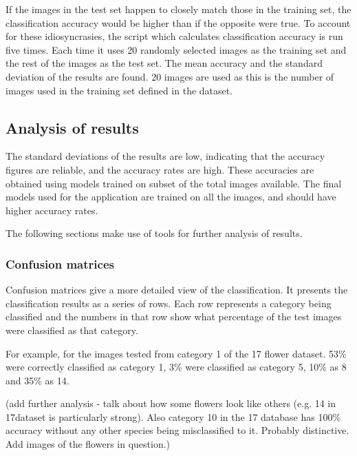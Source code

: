 \documentclass[11pt, a4paper]{report}
\begin{document}
If the images in the test set happen to closely match those in the training set, the classification accuracy would be higher than if the opposite were true. To account for these idiosyncrasies, the script which calculates classification accuracy is run five times. Each time it uses 20 randomly selected images as the training set and the rest of the images as the test set. The mean accuracy and the standard deviation of the results are found. 20 images are used as this is the number of images used in the training set defined in the dataset. 

\subsection{Analysis of results}
%
%
%

The standard deviations of the results are low, indicating that the accuracy figures are reliable, and the accuracy rates are high. These accuracies are obtained using models trained on subset of the total images available. The final models used for the application are trained on all the images, and should have higher accuracy rates.

The following sections make use of tools for further analysis of results. 

\subsubsection{Confusion matrices}

Confusion matrices give a more detailed view of the classification. It presents the classification results as a series of rows. Each row represents a category being classified and the numbers in that row show what percentage of the test images were classified as that category. 

For example, for the images tested from category 1 of the 17 flower dataset. 53\% were correctly classified as category 1, 3\% were classified as category 5, 10\% as 8 and 35\% as 14.

(add further analysis - talk about how some flowers look like others (e.g. 14 in 17dataset is particularly strong). Also category 10 in the 17 database has 100\% accuracy without any other species being misclassified to it. Probably distinctive. Add images of the flowers in question.)
\end{document}
